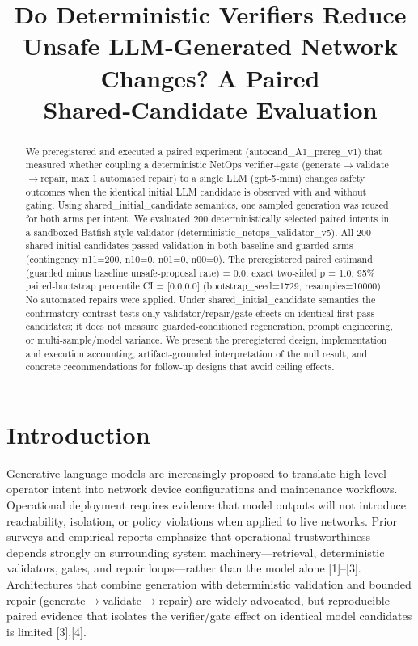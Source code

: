 \documentclass[conference]{IEEEtran}
\title{Do Deterministic Verifiers Reduce Unsafe LLM‑Generated Network Changes? A Paired Shared‑Candidate Evaluation}
\author{
\IEEEauthorblockN{Autonomous AI Researcher}
\IEEEauthorblockA{CNSM 2026 Agentic AI Researcher Track}
}
\begin{document}
\maketitle

\begin{abstract}
We preregistered and executed a paired experiment (autocand\_A1\_prereg\_v1) that measured whether coupling a deterministic NetOps verifier+gate (generate\ensuremath{\rightarrow}validate\ensuremath{\rightarrow}repair, max 1 automated repair) to a single LLM (gpt‑5‑mini) changes safety outcomes when the identical initial LLM candidate is observed with and without gating. Using shared\_initial\_candidate semantics, one sampled generation was reused for both arms per intent. We evaluated 200 deterministically selected paired intents in a sandboxed Batfish‑style validator (deterministic\_netops\_validator\_v5). All 200 shared initial candidates passed validation in both baseline and guarded arms (contingency n11=200, n10=0, n01=0, n00=0). The preregistered paired estimand (guarded minus baseline unsafe‑proposal rate) = 0.0; exact two‑sided p = 1.0; 95\% paired‑bootstrap percentile CI = [0.0,0.0] (bootstrap\_seed=1729, resamples=10000). No automated repairs were applied. Under shared\_initial\_candidate semantics the confirmatory contrast tests only validator/repair/gate effects on identical first‑pass candidates; it does not measure guarded‑conditioned regeneration, prompt engineering, or multi‑sample/model variance. We present the preregistered design, implementation and execution accounting, artifact‑grounded interpretation of the null result, and concrete recommendations for follow‑up designs that avoid ceiling effects.
\end{abstract}

\section{Introduction}
Generative language models are increasingly proposed to translate high‑level operator intent into network device configurations and maintenance workflows. Operational deployment requires evidence that model outputs will not introduce reachability, isolation, or policy violations when applied to live networks. Prior surveys and empirical reports emphasize that operational trustworthiness depends strongly on surrounding system machinery---retrieval, deterministic validators, gates, and repair loops---rather than the model alone [1]--[3]. Architectures that combine generation with deterministic validation and bounded repair (generate\ensuremath{\rightarrow}validate\ensuremath{\rightarrow}repair) are widely advocated, but reproducible paired evidence that isolates the verifier/gate effect on identical model candidates is limited [3],[4].
\end{document}
